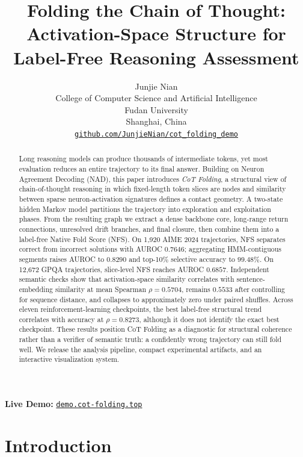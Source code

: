 \documentclass{article}
\title{Folding the Chain of Thought:\\Activation-Space Structure for Label-Free Reasoning Assessment}
\author{Junjie Nian \\
College of Computer Science and Artificial Intelligence \\
Fudan University \\
Shanghai, China \\
\href{https://github.com/JunjieNian/cot_folding_demo}{\texttt{github.com/JunjieNian/cot\_folding\_demo}}}
\newcommand{\nfs}{\textsc{NFS}}
\begin{document}
\raggedbottom
\maketitle
{}

\begin{center}
\vspace{-0.7em}
\textbf{Live Demo:} \href{http://demo.cot-folding.top}{\texttt{demo.cot-folding.top}}
\end{center}
\vspace{0.3em}

\begin{abstract}
Long reasoning models can produce thousands of intermediate tokens, yet most evaluation reduces an entire trajectory to its final answer. Building on Neuron Agreement Decoding (NAD), this paper introduces \emph{CoT Folding}, a structural view of chain-of-thought reasoning in which fixed-length token slices are nodes and similarity between sparse neuron-activation signatures defines a contact geometry. A two-state hidden Markov model partitions the trajectory into exploration and exploitation phases. From the resulting graph we extract a dense backbone core, long-range return connections, unresolved drift branches, and final closure, then combine them into a label-free Native Fold Score (\nfs). On 1,920 AIME 2024 trajectories, \nfs{} separates correct from incorrect solutions with AUROC $0.7646$; aggregating HMM-contiguous segments raises AUROC to $0.8290$ and top-10\% selective accuracy to $99.48\%$. On 12,672 GPQA trajectories, slice-level \nfs{} reaches AUROC $0.6857$. Independent semantic checks show that activation-space similarity correlates with sentence-embedding similarity at mean Spearman $\rho=0.5704$, remains $0.5533$ after controlling for sequence distance, and collapses to approximately zero under paired shuffles. Across eleven reinforcement-learning checkpoints, the best label-free structural trend correlates with accuracy at $\rho=0.8273$, although it does not identify the exact best checkpoint. These results position CoT Folding as a diagnostic for structural coherence rather than a verifier of semantic truth: a confidently wrong trajectory can still fold well. We release the analysis pipeline, compact experimental artifacts, and an interactive visualization system.
\end{abstract}

\section{Introduction}
\end{document}
